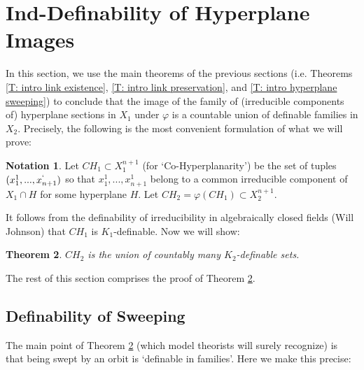 \documentclass{amsart}
\newtheorem{theorem}{Theorem}[section]
\theoremstyle{definition}
\newtheorem{notation}[theorem]{Notation}
\begin{document}
\section{Ind-Definability of Hyperplane Images}

In this section, we use the main theorems of the previous sections (i.e. Theorems \ref{T: intro link existence}, \ref{T: intro link preservation}, and \ref{T: intro hyperplane sweeping}) to conclude that the image of the family of (irreducible components of) hyperplane sections in $X_1$ under $\varphi$ is a countable union of definable families in $X_2$. Precisely, the following is the most convenient formulation of what we will prove:

\begin{notation}
     Let $CH_1\subset X_1^{n+1}$ (for `Co-Hyperplanarity') be the set of tuples $(x_1^1,...,x_{n+1}^`)$ so that $x_1^1,...,x_{n+1}^1$ belong to a common irreducible component of $X_1\cap H$ for some hyperplane $H$. Let $CH_2=\varphi(CH_1)\subset X_2^{n+1}$.
\end{notation}

It follows from the definability of irreducibility in algebraically closed fields (Will Johnson) that $CH_1$ is $K_1$-definable. Now we will show:

\begin{theorem}\label{t: ind-definable} $CH_2$ is the union of countably many $K_2$-definable sets.
\end{theorem}

The rest of this section comprises the proof of Theorem \ref{t: ind-definable}.

\subsection{Definability of Sweeping}

The main point of Theorem \ref{t: ind-definable} (which model theorists will surely recognize) is that being swept by an orbit is `definable in families'. Here we make this precise:
\end{document}
